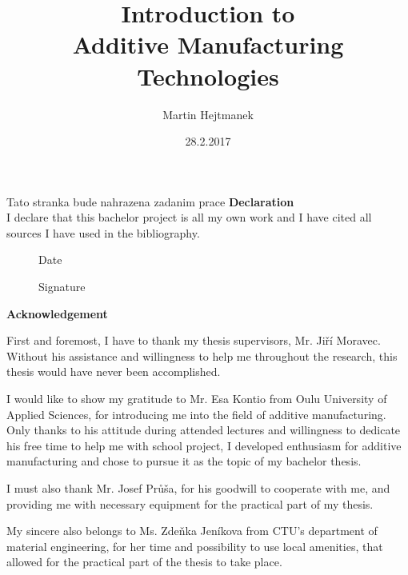 \documentclass[a4paper, twoside, 11pt]{report}
\begin{document}
%
\begin{titlepage}
\title{Introduction to\\Additive Manufacturing Technologies}
\author{Martin Hejtmanek}
\date{28.2.2017}
\maketitle
\end{titlepage}
%
%
%
Tato stranka bude nahrazena zadanim prace
%
%
%
\newpage
\vspace*{\fill}
\LARGE
\noindent
\textbf{Declaration}\\[10pt]
\normalsize
I declare that this bachelor project is all my own work and I have cited all sources I have used in the bibliography.
\\[10pt]

\begin{figure}[b!]
\begin{minipage}[t]{0.3\textwidth}
    Date
    \dotfill
\end{minipage}
\hfill
\begin{minipage}[t]{0.3\textwidth}
	Signature
	\dotfill
\end{minipage}
\end{figure}
%
%
%
\newpage
\vspace*{\fill}
\LARGE
\noindent
\textbf{Acknowledgement}\\[10pt]
\normalsize

	First and foremost, I have to thank my thesis supervisors, Mr. Jiří Moravec. Without his assistance and willingness to help me throughout the research, this thesis would have never been accomplished.
	

	I would like to show my gratitude to Mr. Esa Kontio from Oulu University of Applied Sciences, for introducing me into the field of additive manufacturing. Only thanks to his attitude during attended lectures and willingness to dedicate his free time to help me with school project, I developed enthusiasm for additive manufacturing and chose to pursue it as the topic of my bachelor thesis.
	
	
	I must also thank Mr. Josef Průša, for his goodwill to cooperate with me, and providing me with necessary equipment for the practical part of my thesis.


	My sincere also belongs to Ms. Zdeňka Jeníkova from CTU's department of material engineering, for her time and possibility to use local amenities, that allowed for the practical part of the thesis to take place.
	
\end{document}
